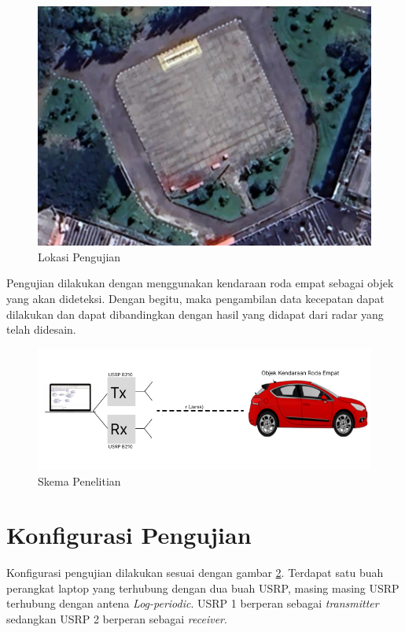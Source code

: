 \begin{figure}
	\begin{center}
		\includegraphics[scale=0.5]{pics/bab3/petaPengujian.png}
		\caption{Lokasi Pengujian}
		\label{img:petaUji}
	\end{center}
\end{figure}

Pengujian dilakukan dengan menggunakan kendaraan roda empat sebagai objek yang akan dideteksi. Dengan begitu, maka pengambilan data kecepatan dapat dilakukan dan dapat dibandingkan dengan hasil yang didapat dari radar yang telah didesain.

\begin{figure}
	\begin{center}
		\includegraphics[scale=0.5]{pics/bab3/skema.png}
		\caption{Skema Penelitian}
		\label{img:skema}
	\end{center}
\end{figure}

\section{Konfigurasi Pengujian}
Konfigurasi pengujian dilakukan sesuai dengan gambar \ref{img:skema}. Terdapat satu buah perangkat laptop yang terhubung dengan dua buah USRP, masing masing USRP terhubung dengan antena \textit{Log-periodic}. USRP 1 berperan sebagai \textit{transmitter} sedangkan USRP 2 berperan sebagai \textit{receiver}.


